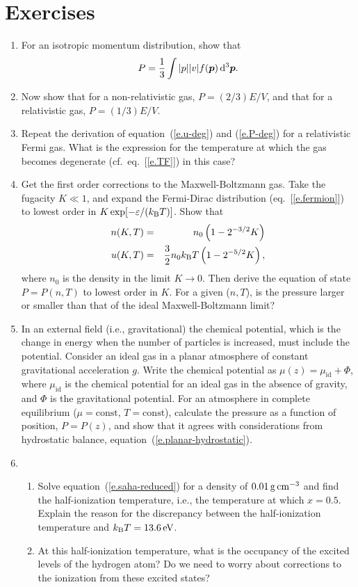 \section{Exercises}\label{s.EOS-exercises}
\begin{enumerate}
\item For an isotropic momentum distribution, show that 
\[
P = \frac{1}{3}\int |p||v| f(\boldsymbol{p})\,\mathrm{d}^{3}\boldsymbol{p}.
\]
\item Now show that for a non-relativistic gas, $P = (2/3)E/V$, and that for a relativistic gas, $P = (1/3)E/V$.

\item Repeat the derivation of equation~(\ref{e.u-deg}) and (\ref{e.P-deg}) for  a relativistic Fermi gas. What is the expression for the temperature at which the gas becomes degenerate (cf.~eq.~[\ref{e.TF}]) in this case?

\item Get the first order corrections to the Maxwell-Boltzmann gas. Take the fugacity $K \ll 1$, and expand the Fermi-Dirac distribution  (eq.~[\ref{e.fermion}]) to lowest order in $K\exp[-\varepsilon/(k_\mathrm{B} T)]$. Show that 
\begin{eqnarray*}
 n(K,T) &=& n_{0}\left(1 - 2^{-3/2}K\right) \\
 u(K,T) &=& \frac{3}{2}n_{0}k_\mathrm{B} T \left(1-2^{-5/2}K\right),
\end{eqnarray*}
where $n_{0}$ is the density in the limit $K\to 0$.
Then derive the equation of state $P = P(n,T)$ to lowest order in $K$. For a given ($n, T$), is the pressure larger or smaller than that of the ideal Maxwell-Boltzmann limit?

\item In an external field (i.e., gravitational) the chemical potential, which is the change in energy when the number of particles is increased, must include the potential.  Consider an ideal gas in a planar atmosphere of  constant gravitational acceleration $g$.  Write the chemical potential as $\mu(z)  = \mu_{\mathrm{id}} + \Phi$, where $\mu_{\mathrm{id}}$ is the chemical potential for an ideal gas in the absence of gravity, and $\Phi$ is the gravitational potential.  For an atmosphere in complete equilibrium ($\mu = \mathrm{const}$, $T = \mathrm{const}$), calculate the pressure as a function of position, $P = P(z)$, and show that it agrees with considerations from hydrostatic balance, equation~(\ref{e.planar-hydrostatic}).

\item 
\begin{enumerate}
\item Solve equation~(\ref{e.saha-reduced}) for a density of $0.01\,\mathrm{g}\,{\mathrm{c}\mathrm{m}}^{-3}$ and find the half-ionization temperature, i.e., the temperature at which $x=0.5$.  Explain the reason for the discrepancy between the half-ionization temperature and $k_\mathrm{B} T = 13.6\,\mathrm{eV}$.

\item At this half-ionization temperature, what is the occupancy of the excited levels of the hydrogen atom?  Do we need to worry about corrections to the ionization from these excited states?
\end{enumerate}

\end{enumerate}
